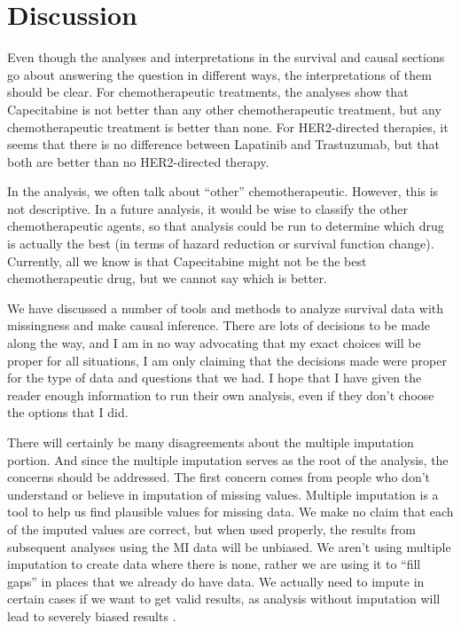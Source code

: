 \chapter{Discussion}
Even though the analyses and interpretations in the survival and causal sections go about answering the question in different ways, the interpretations of them should be clear. For chemotherapeutic treatments, the analyses show that Capecitabine is not better than any other chemotherapeutic treatment, but any chemotherapeutic treatment is better than none. For HER2-directed therapies, it seems that there is no difference between Lapatinib and Trastuzumab, but that both are better than no HER2-directed therapy.

In the analysis, we often talk about ``other'' chemotherapeutic. However, this is not descriptive. In a future analysis, it would be wise to classify the other chemotherapeutic agents, so that analysis could be run to determine which drug is actually the best (in terms of hazard reduction or survival function change). Currently, all we know is that Capecitabine might not be the best chemotherapeutic drug, but we cannot say which is better. 

We have discussed a number of tools and methods to analyze survival data with missingness and make causal inference.  There are lots of decisions to be made along the way, and I am in no way advocating that my exact choices will be proper for all situations, I am only claiming that the decisions made were proper for the type of data and questions that we had. I hope that I have given the reader enough information to run their own analysis, even if they don't choose the options that I did.

There will certainly be many disagreements about the multiple imputation portion. And since the multiple imputation serves as the root of the analysis, the concerns should be addressed. The first concern comes from people who don't understand or believe in imputation of missing values. Multiple imputation is a tool to help us find plausible values for missing data. We make no claim that each of the imputed values are correct, but when used properly, the results from subsequent analyses using the MI data will be unbiased. We aren't using multiple imputation to create data where there is none, rather we are using it to ``fill gaps'' in places that we already do have data. We actually need to impute in certain cases if we want to get valid results, as analysis without imputation will lead to severely biased results \cite{VanBuuren2012}.
\begin{comment}
Might want to put this earlier on
 For example, if teenage males who are obese don't want to self-report their weight, then classic available case analysis will yield biased results because we have knowingly left out part of the population who are systematically different We need to impute to make sure we have included all of the information and not to bias our estimate.
\end{comment}

